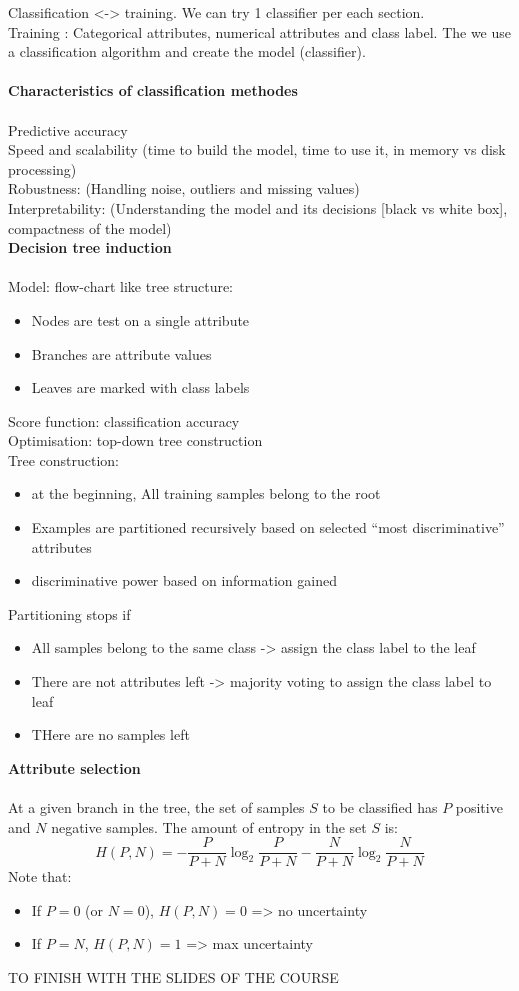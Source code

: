 Classification <-> training. We can try 1 classifier per each section. \\
Training : Categorical attributes, numerical attributes and class label. The we use a classification algorithm and create the model (classifier). \\\\
\textbf{Characteristics of classification methodes} 
\\\\
Predictive accuracy \\
Speed and scalability (time to build the model, time to use it, in memory vs disk processing) \\
Robustness: (Handling noise, outliers and missing values) \\
Interpretability: (Understanding the model and its decisions [black vs white box], compactness of the model) \\
\textbf{Decision tree induction} 
\\\\
Model: flow-chart like tree structure:
\begin{itemize}
 \item Nodes are test on a single attribute
 \item Branches are attribute values
 \item Leaves are marked with class labels
\end{itemize}
Score function: classification accuracy \\
Optimisation: top-down tree construction \\
Tree construction:
\begin{itemize}
 \item at the beginning, All training samples belong to the root
 \item Examples are partitioned recursively based on selected ``most discriminative'' attributes
 \item discriminative power based on information gained
\end{itemize}
Partitioning stops if 
\begin{itemize}
 \item All samples belong to the same class -> assign the class label to the leaf
 \item There are not attributes left -> majority voting to assign the class label to leaf
 \item THere are no samples left
\end{itemize}
\textbf{Attribute selection}
\\\\
At a given branch in the tree, the set of samples $S$ to be classified has $P$ positive and $N$ negative samples. The amount of entropy in the set $S$ is:
\[
 H(P,N)=-\frac{P}{P+N}\log_2\frac{P}{P+N}-\frac{N}{P+N}\log_2\frac{N}{P+N}
\]
Note that:
\begin{itemize}
 \item If $P=0$ (or $N=0$), $H(P,N)=0$ => no uncertainty
 \item If $P=N$, $H(P,N)=1$ => max uncertainty
\end{itemize}
{\huge \color{red} TO FINISH WITH THE SLIDES OF THE COURSE}




